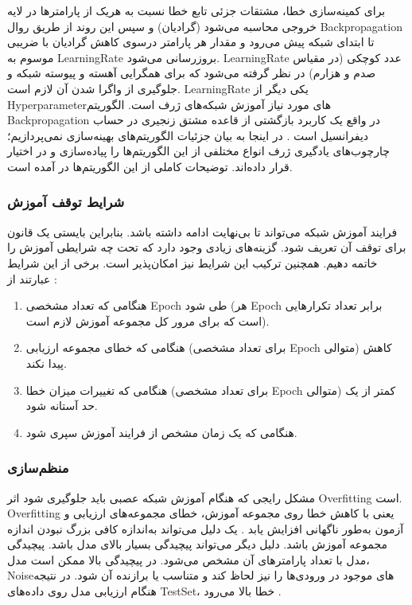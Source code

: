  برای کمینه‌سازی خطا، مشتقات جزئی تابع خطا نسبت به هریک از پارامترها در لایه خروجی محاسبه می‌شود (گرادیان) و سپس این روند از طریق روال \gls{Backpropagation} تا ابتدای شبکه پیش‌ می‌رود و مقدار هر پارامتر درسوی کاهش گرادیان با ضریبی موسوم به \gls{LearningRate} بروزرسانی می‌شود. \gls{LearningRate} عدد کوچکی (در مقیاس صدم و هزارم) در نظر گرفته می‌شود که برای همگرایی آهسته و پیوسته شبکه و جلوگیری از واگرا شدن آن لازم است. \gls{LearningRate} یکی دیگر از \gls{Hyperparameter}های مورد نیاز آموزش شبکه‌های ژرف است. الگوریتم \gls{Backpropagation} در واقع یک کاربرد بازگشتی از قاعده مشتق زنجیری در حساب دیفرانسیل است \cite{Karpathy2016}. در اینجا به بیان جزئیات الگوریتم‌های بهینه‌سازی نمی‌پردازیم؛ چارچوب‌های یادگیری ژرف انواع مختلفی از این الگوریتم‌ها را پیاده‌سازی و در اختیار قرار داده‌اند. توضیحات کاملی از این الگوریتم‌ها در  \cite{Goodfellow-et-al-2016} آمده است.
 
 
 \subsubsection{شرایط توقف آموزش}\label{sec:stop_conditions}
 فرایند آموزش شبکه می‌تواند تا بی‌نهایت ادامه داشته باشد. بنابراین بایستی یک قانون برای توقف آن تعریف شود. گزینه‌‌های زیادی وجود دارد که تحت چه شرایطی آموزش را خاتمه دهیم. همچنین ترکیب این شرایط نیز امکان‌پذیر است. برخی از این شرایط عبارتند از \cite{Sautermeister2016}:
 
 \begin{enumerate}
 	\item{
 	هنگامی که تعداد مشخصی \gls{Epoch} طی شود (هر \gls{Epoch} برابر تعداد تکرارهایی است که برای مرور کل مجموعه آموزش لازم است).
 	} 
 	\item{
 	هنگامی که خطای مجموعه ارزیابی (برای تعداد مشخصی \gls{Epoch} متوالی) کاهش پیدا نکند.
 }

\item{
	هنگامی که تغییرات میزان خطا (برای تعداد مشخصی \gls{Epoch} متوالی) کمتر از یک حد آستانه شود.
} 
\item{
	هنگامی که یک زمان مشخص از فرایند آموزش سپری شود.
} 
\end{enumerate} 



 \subsubsection{منظم‌سازی}
مشکل رایجی که هنگام آموزش شبکه عصبی باید جلوگیری شود اثر \gls{Overfitting} است. \gls{Overfitting} یعنی با کاهش خطا روی مجموعه آموزش، خطای مجموعه‌‌های ارزیابی و آزمون به‌طور ناگهانی افزایش ‌یابد \cite{Goodfellow-et-al-2016}. یک دلیل می‌تواند به‌اندازه کافی بزرگ نبودن اندازه مجموعه آموزش باشد. دلیل دیگر می‌تواند پیچیدگی بسیار بالای مدل باشد. پیچیدگی مدل با تعداد پارامترهای  آن مشخص می‌شود. در پیچیدگی بالا ممکن است مدل، \gls{Noise}های موجود در ورودی‌ها را نیز لحاظ کند و متناسب یا برازنده آن شود. در نتیجه هنگام ارزیابی مدل روی داده‌های \gls{TestSet}، خطا بالا می‌رود \cite{Sautermeister2016}. 

